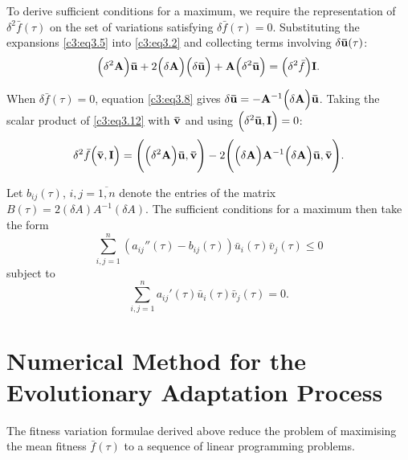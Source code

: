 \documentclass[12pt]{report}
\theoremstyle{definition}
\theoremstyle{remark}
\begin{document}
To derive sufficient conditions for a maximum, we require the representation of $\delta^2\bar{f}(\tau)$ on the set of variations satisfying $\delta\bar{f}(\tau)=0$. Substituting the expansions \eqref{c3:eq3.5} into \eqref{c3:eq3.2} and collecting terms involving $\delta{\bf \bar{u}}(\tau)$:
\begin{equation}
	\Big(\delta^{2}{\bf A}\Big){\bf \bar{u}} + 2\Big(\delta{\bf A}\Big)\Big(\delta{\bf \bar{u}}\Big) + {\bf A}\Big(\delta^{2}{\bf \bar{u}}\Big) = \Big(\delta^{2}\bar{f}\Big){\bf I}.
\label{c3:eq3.12}
\end{equation}

When $\delta\bar{f}(\tau) = 0$, equation \eqref{c3:eq3.8} gives $\delta{\bf \bar{u}} = -{\bf A}^{-1}\Big(\delta{\bf A}\Big){\bf \bar{u}}$. Taking the scalar product of \eqref{c3:eq3.12} with ${\bf \bar{v}}$ and using $\Big(\delta^{2}{\bf \bar{u}, I}\Big) = 0$:
$$
	\delta^{2}\bar{f}\Big({\bf \bar{v}, I}\Big) = \Bigg(\Big(\delta^{2}{\bf A}\Big) {\bf \bar{u}, \bar{v}}\Bigg) - 2\Bigg(\Big(\delta{\bf A}\Big) {\bf A}^{-1}\Big(\delta{\bf A}\Big) {\bf \bar{u}, \bar{v}}\Bigg).
$$ 

Let $b_{ij}(\tau)$, $i, j=\overline{1,n}$ denote the entries of the matrix $B(\tau)=2(\delta A)A^{-1}(\delta A)$. The sufficient conditions for a maximum then take the form
\begin{equation*}
	\sum\limits_{i,j=1}^n \left(a_{ij}''(\tau) - b_{ij}(\tau)\right) \bar{u}_i(\tau)\bar{v}_j(\tau) \leqslant 0
\end{equation*}
subject to
\begin{equation*}
	\sum\limits_{i,j=1}^n a_{ij}'(\tau) \bar{u}_i(\tau)\bar{v}_j(\tau) = 0.
\end{equation*}

\clearpage

\section{Numerical Method for the Evolutionary Adaptation Process}\label{c3:section:3.3}
The fitness variation formulae derived above reduce the problem of maximising the mean fitness $\bar{f}(\tau)$ to a sequence of linear programming problems.
\end{document}
